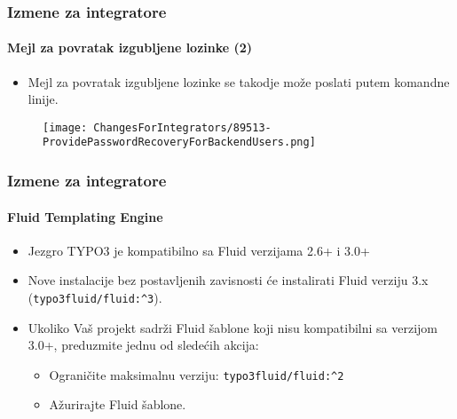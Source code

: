 
\begin{frame}[fragile]
	\frametitle{Izmene za integratore}
	\framesubtitle{Mejl za povratak izgubljene lozinke (2)}

	\begin{itemize}
		\item Mejl za povratak izgubljene lozinke se takodje može poslati putem komandne linije.
	\end{itemize}

	\begin{figure}
		\texttt{[image: ChangesForIntegrators/89513-ProvidePasswordRecoveryForBackendUsers.png]}
	\end{figure}

\end{frame}


\begin{frame}[fragile]
	\frametitle{Izmene za integratore}
	\framesubtitle{Fluid Templating Engine}

	\begin{itemize}
		\item Jezgro TYPO3 je kompatibilno sa Fluid verzijama 2.6+ i 3.0+
		\item Nove instalacije bez postavljenih zavisnosti će instalirati Fluid verziju 3.x
			(\texttt{typo3fluid/fluid:\^{}3}).
		\item Ukoliko Vaš projekt sadrži Fluid šablone koji nisu kompatibilni sa verzijom 3.0+,
			preduzmite jednu od sledećih akcija:

			\begin{itemize}
				\item Ograničite maksimalnu verziju: \texttt{typo3fluid/fluid:\^{}2}
				\item Ažurirajte Fluid šablone.
			\end{itemize}

	\end{itemize}

\end{frame}


